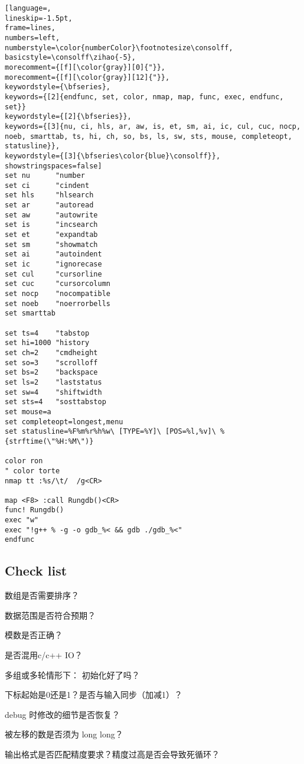 \begin{lstlisting}[language=,
lineskip=-1.5pt,
frame=lines,
numbers=left,
numberstyle=\color{numberColor}\footnotesize\consolff,
basicstyle=\consolff\zihao{-5},
morecomment={[f][\color{gray}][0]{"}},
morecomment={[f][\color{gray}][12]{"}},
keywordstyle={\bfseries},
keywords={[2]{endfunc, set, color, nmap, map, func, exec, endfunc, set}}
keywordstyle={[2]{\bfseries}},
keywords={[3]{nu, ci, hls, ar, aw, is, et, sm, ai, ic, cul, cuc, nocp, noeb, smarttab, ts, hi, ch, so, bs, ls, sw, sts, mouse, completeopt, statusline}},
keywordstyle={[3]{\bfseries\color{blue}\consolff}},
showstringspaces=false]
set nu      "number
set ci      "cindent
set hls     "hlsearch
set ar      "autoread
set aw      "autowrite
set is      "incsearch
set et      "expandtab
set sm      "showmatch
set ai      "autoindent
set ic      "ignorecase
set cul     "cursorline
set cuc     "cursorcolumn
set nocp    "nocompatible
set noeb    "noerrorbells
set smarttab 

set ts=4    "tabstop
set hi=1000 "history
set ch=2    "cmdheight
set so=3    "scrolloff
set bs=2    "backspace
set ls=2    "laststatus
set sw=4    "shiftwidth
set sts=4   "sosttabstop
set mouse=a
set completeopt=longest,menu
set statusline=%F%m%r%h%w\ [TYPE=%Y]\ [POS=%l,%v]\ %{strftime(\"%H:%M\")}

color ron
" color torte
nmap tt :%s/\t/  /g<CR>

map <F8> :call Rungdb()<CR>
func! Rungdb()
exec "w"
exec "!g++ % -g -o gdb_%< && gdb ./gdb_%<"
endfunc
\end{lstlisting}

\subsection{Check list}

\begin{compactenum}
\item 数组是否需要排序？
\item 数据范围是否符合预期？
\item 模数是否正确？
\item 是否混用c/c++ IO？
\item 多组或多轮情形下： 初始化好了吗？
\item 下标起始是0还是1？是否与输入同步（加减1）？
\item debug 时修改的细节是否恢复？
\item 被左移的数是否须为 long long？
\item 输出格式是否匹配精度要求？精度过高是否会导致死循环？
\end{compactenum}
